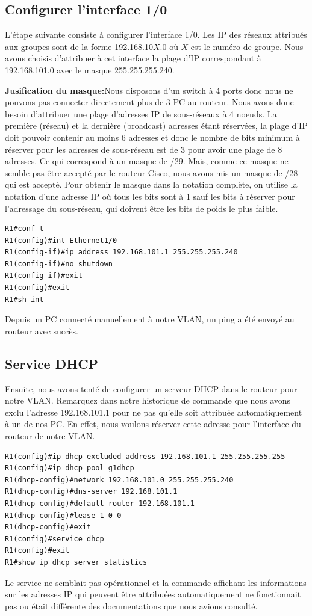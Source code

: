 \documentclass[a4paper,10pt]{article}
\begin{document}
\subsection{Configurer l'interface 1/0}
L'étape suivante consiste à configurer l'interface 1/0.
Les IP des réseaux attribués aux groupes sont de la forme 192.168.10$X$.0 où $X$ est le numéro de groupe.
Nous avons choisis d'attribuer à cet interface la plage d'IP correspondant à 192.168.101.0 avec le masque 255.255.255.240.

\textbf{Jusification du masque:}Nous disposons d'un switch à 4 ports donc nous ne pouvons pas connecter directement plus de 3 PC au routeur.
Nous avons donc besoin d'attribuer une plage d'adresses IP de sous-réseaux à 4 noeuds.
La première (réseau) et la dernière (broadcast) adresses étant réservées, la plage d'IP doit pouvoir contenir au moins 6 adresses et donc le nombre de bits minimum à réserver pour les adresses de sous-réseau est de 3 pour avoir une plage de 8 adresses.
Ce qui correspond à un masque de /29.
Mais, comme ce masque ne semble pas être accepté par le routeur Cisco, nous avons mis un masque de /28 qui est accepté.
Pour obtenir le masque dans la notation complète, on utilise la notation d'une adresse IP où tous les bits sont à 1 sauf les bits à réserver pour l'adressage du sous-réseau, qui doivent être les bits de poids le plus faible.
\begin{verbatim}
R1#conf t
R1(config)#int Ethernet1/0
R1(config-if)#ip address 192.168.101.1 255.255.255.240
R1(config-if)#no shutdown
R1(config-if)#exit
R1(config)#exit
R1#sh int
\end{verbatim}
Depuis un PC connecté manuellement à notre VLAN, un ping a été envoyé au routeur avec succès.

\subsection{Service DHCP}
Ensuite, nous avons tenté de configurer un serveur DHCP dans le routeur pour notre VLAN.
Remarquez dans notre historique de commande que nous avons exclu l'adresse 192.168.101.1 pour ne pas qu'elle soit attribuée automatiquement à un de nos PC.
En effet, nous voulons réserver cette adresse pour l'interface du routeur de notre VLAN.
\begin{verbatim}
R1(config)#ip dhcp excluded-address 192.168.101.1 255.255.255.255
R1(config)#ip dhcp pool g1dhcp
R1(dhcp-config)#network 192.168.101.0 255.255.255.240
R1(dhcp-config)#dns-server 192.168.101.1
R1(dhcp-config)#default-router 192.168.101.1
R1(dhcp-config)#lease 1 0 0
R1(dhcp-config)#exit
R1(config)#service dhcp
R1(config)#exit
R1#show ip dhcp server statistics
\end{verbatim}
Le service ne semblait pas opérationnel et la commande affichant les informations sur les adresses IP qui peuvent être attribuées automatiquement ne fonctionnait pas ou était différente des documentations que nous avions consulté.
\end{document}
